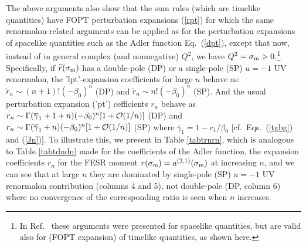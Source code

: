 \documentclass[aps,nofootinbib,showkeys,noshowpacs,preprintnumbers,amsmath,amssymb]{revtex4}
\newcommand{\sm}{{\sigma_{\rm m}}}
\newcommand{\tr}{{\widetilde r}}
\newcommand{\bg}{{\overline {\gamma}}}
\begin{document}
The above arguments also show that the sum rules (which are timelike quantities) have FOPT perturbation expansions (\ref{rpt}) for which the same renormalon-related arguments \cite{renmod} can be applied as for the perturbation expansions of spacelike quantities such as the Adler function Eq.~(\ref{dpt}), except that now, instead of in general complex (and nonnegative) $Q^2$, we have $Q^2 = \sm >0$.\footnote{In Ref.~\cite{renmod} these arguments were presented for spacelike quantities, but are valid also for (FOPT expansion) of timelike quantities, as shown here.} Specifically, if $\tr(\sm)$ has a double-pole (DP) or a single-pole (SP) $u=-1$ UV renormalon, the 'lpt'-expansion coefficients for large $n$ behave as: $\tr_n \sim (n+1)! (- \beta_0)^n$ (DP) and   $\tr_n \sim n! (- \beta_0)^n$ (SP). And the usual perturbation expansion ('pt') cefficients $r_n$ behave as $r_n \sim \Gamma(\bg_1 + 1 +n) (-\beta_0)^n [1 + {\cal O}(1/n)]$ (DP) and  $r_n \sim \Gamma(\bg_1 +n) (-\beta_0)^n  [1 + {\cal O}(1/n)]$ (SP) where $\bg_1=1 - c_1/\beta_0$ [cf.~Eqs.~(\ref{tgbg}) and (\ref{Jn})]. To illustrate this, we present in Table \ref{tabtrnrn}, which is analogous to Table \ref{tabtdndn} made for the coefficients of the Adler function, the expansion coefficients $r_n$ for the FESR moment $r(\sm) = a^{(2,1)}(\sm)$ at increasing $n$, and we can see that at large $n$ they are dominated by single-pole (SP) $u=-1$ UV renormalon contribution (columns 4 and 5), not double-pole (DP, column 6) where no convergence of the corresponding ratio is seen when $n$ increases.
\end{document}
